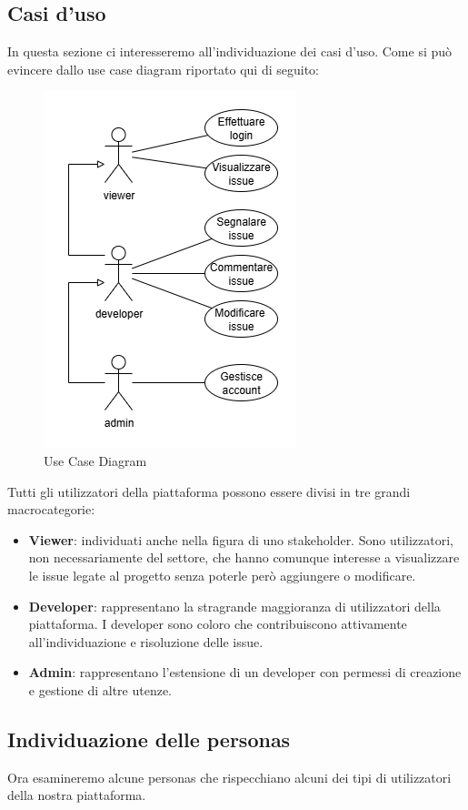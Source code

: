 \documentclass[a4paper, 11pt]{article}
\begin{document}
\subsection{Casi d'uso}
In questa sezione ci interesseremo all’individuazione dei casi d’uso. Come si può evincere dallo use case diagram riportato qui di seguito: 

\begin{figure}[H]
    \centering
    \includegraphics[width=0.5\linewidth]{UseCase_Diagram}
    \caption{Use Case Diagram}
    \label{fig:use_case_diagram}
\end{figure}

Tutti gli utilizzatori della piattaforma possono essere divisi in tre grandi macrocategorie: 
\begin{itemize}
    \item \textbf{Viewer}: individuati anche nella figura di uno stakeholder. Sono utilizzatori, non necessariamente del settore, che hanno comunque interesse a visualizzare le issue legate al progetto senza poterle però aggiungere o modificare. 
    \item \textbf{Developer}: rappresentano la stragrande maggioranza di utilizzatori della piattaforma. I developer sono coloro che contribuiscono attivamente all’individuazione e risoluzione delle issue.
    \item \textbf{Admin}: rappresentano l’estensione di un developer con permessi di creazione e gestione di altre utenze.
\end{itemize} 

\newpage
\subsection{Individuazione delle personas}
Ora esamineremo alcune personas che rispecchiano alcuni dei tipi di utilizzatori della nostra piattaforma. 
\end{document}
